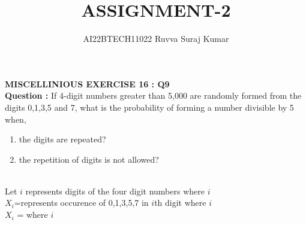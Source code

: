 \documentclass[journal,12pt,twocolumn]{IEEEtran}
\begin{document}
       
\title{ASSIGNMENT-2} 
\author{AI22BTECH11022 Ruvva Suraj Kumar}      


\maketitle

\newpage

\bigskip


\textbf{MISCELLINIOUS EXERCISE 16 : Q9}\\

\textbf{Question :} If 4-digit numbers greater than 5,000 are randomly formed from the digits 0,1,3,5 and 7, what is the probability of forming a number divisible by 5 when,


\begin{enumerate}[label=(\roman*)]
\item the digits are repeated?
\item the repetition of digits is not allowed?
\end{enumerate}


\solution \\

Let $ i $ represents digits of the four digit numbers where $ i $ \in {}\\ 
$X_{i}$=represents occurence of 0,1,3,5,7 in $i$th digit where $ i $ \in {}\\
\Rightarrow $ X_{i} $ =  where $ i $ \in {}\\
\end{document}
